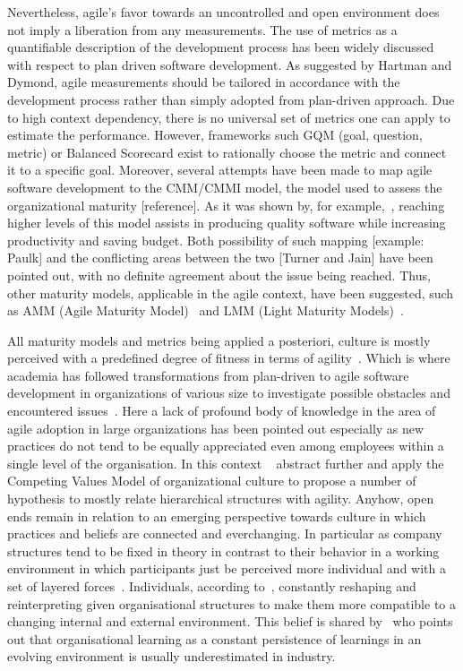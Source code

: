 \documentclass[paper=a4, fontsize=11pt]{scrartcl}
\numberwithin{equation}{section}		%
\numberwithin{figure}{section}			%
\numberwithin{table}{section}			%
\begin{document}
Nevertheless, agile's favor towards an uncontrolled and open environment does not imply a liberation from any measurements. The use of metrics as a quantifiable description of the development process has been widely discussed with respect to plan driven software development. As suggested by Hartman and Dymond, agile measurements should be tailored in accordance with the development process rather than simply adopted from plan-driven approach. Due to high context dependency, there is no universal set of metrics one can apply to estimate the performance. However, frameworks \textemdash such GQM (goal, question, metric) or Balanced Scorecard \textemdash exist to rationally choose the metric and connect it to a specific goal.
Moreover, several attempts have been made to map agile software development to the CMM/CMMI model, the model used to assess the organizational maturity [reference]. As it was shown by, for example,~\citet{pitterman2000maturity}, reaching higher levels of this model assists in producing quality software while increasing productivity and saving budget. Both possibility of such mapping [example: Paulk] and the conflicting areas between the two [Turner and Jain] have been pointed out, with no definite agreement about the issue being reached. Thus, other maturity models, applicable in the agile context, have been suggested, such as AMM (Agile Maturity Model)~\citep{chetankumar2009amm} and LMM (Light Maturity Models)~\citep{buglione2011lmm}.

All maturity models and metrics being applied a posteriori, culture is mostly perceived with a predefined degree of fitness in terms of agility~\citep{ivari2011orgagile}. Which is where academia has followed transformations from plan-driven to agile software development in organizations of various size to investigate possible obstacles and encountered issues~\citep{laanti2011nokia}. Here a lack of profound body of knowledge in the area of agile adoption in large organizations has been pointed out especially as new practices do not tend to be equally appreciated even among employees within a single level of the organisation. In this context ~\citet{ivari2011orgagile} abstract further and apply the Competing Values Model of organizational culture to propose a number of hypothesis to mostly relate hierarchical structures with agility. Anyhow, open ends remain in relation to an emerging perspective towards culture in which practices and beliefs are connected and everchanging.
In particular as company structures tend to be fixed in theory in contrast to their behavior in a working environment in which participants just be perceived more individual and with a set of layered forces~\citep{gallivan2005persculture}. Individuals, according to~\citet{iivari2010usability}, constantly reshaping and reinterpreting given organisational structures to make them more compatible to a changing internal and external environment. This belief is shared by~\citet{robey2000learning} who points out that organisational learning as a constant persistence of learnings in an evolving environment is usually underestimated in industry.
\end{document}
